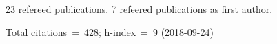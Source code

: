 23 refereed publications. 7 refeered publications as first author.

               Total citations~=~428; h-index~=~9 (2018-09-24)